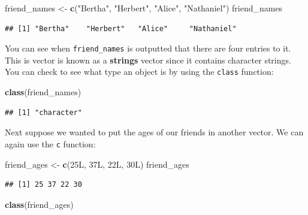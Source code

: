 \documentclass[]{tufte-book}
\newenvironment{Shaded}{\begin{snugshade}}{\end{snugshade}}
\newcommand{\DataTypeTok}[1]{\textcolor[rgb]{0.13,0.29,0.53}{#1}}
\newcommand{\DecValTok}[1]{\textcolor[rgb]{0.00,0.00,0.81}{#1}}
\newcommand{\FunctionTok}[1]{\textcolor[rgb]{0.13,0.29,0.53}{\textbf{#1}}}
\newcommand{\NormalTok}[1]{#1}
\newcommand{\OtherTok}[1]{\textcolor[rgb]{0.56,0.35,0.01}{#1}}
\newcommand{\StringTok}[1]{\textcolor[rgb]{0.31,0.60,0.02}{#1}}
\begin{document}
\begin{Shaded}
\begin{Highlighting}[]
\NormalTok{friend\_names }\OtherTok{\textless{}{-}} \FunctionTok{c}\NormalTok{(}\StringTok{"Bertha"}\NormalTok{, }\StringTok{"Herbert"}\NormalTok{, }\StringTok{"Alice"}\NormalTok{, }\StringTok{"Nathaniel"}\NormalTok{)}
\NormalTok{friend\_names}
\end{Highlighting}
\end{Shaded}

\begin{verbatim}
## [1] "Bertha"    "Herbert"   "Alice"     "Nathaniel"
\end{verbatim}

You can see when \texttt{friend\_names} is outputted that there are four entries to it. This is vector is known as a \textbf{strings} vector since it contains character strings. You can check to see what type an object is by using the \texttt{class} function:

\begin{Shaded}
\begin{Highlighting}[]
\FunctionTok{class}\NormalTok{(friend\_names)}
\end{Highlighting}
\end{Shaded}

\begin{verbatim}
## [1] "character"
\end{verbatim}

Next suppose we wanted to put the ages of our friends in another vector. We can again use the \texttt{c} function:

\begin{Shaded}
\begin{Highlighting}[]
\NormalTok{friend\_ages }\OtherTok{\textless{}{-}} \FunctionTok{c}\NormalTok{(}\DecValTok{25}\DataTypeTok{L}\NormalTok{, }\DecValTok{37}\DataTypeTok{L}\NormalTok{, }\DecValTok{22}\DataTypeTok{L}\NormalTok{, }\DecValTok{30}\DataTypeTok{L}\NormalTok{)}
\NormalTok{friend\_ages}
\end{Highlighting}
\end{Shaded}

\begin{verbatim}
## [1] 25 37 22 30
\end{verbatim}

\begin{Shaded}
\begin{Highlighting}[]
\FunctionTok{class}\NormalTok{(friend\_ages)}
\end{Highlighting}
\end{Shaded}
\end{document}
